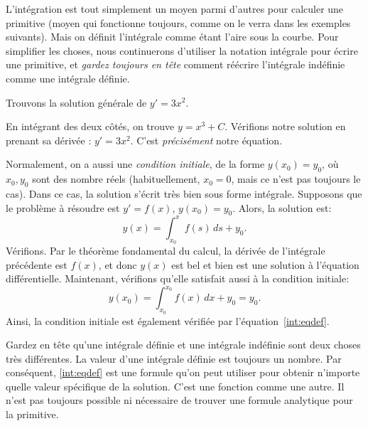 L'intégration est tout simplement un moyen parmi d'autres pour calculer une primitive
(moyen qui fonctionne toujours, comme on le verra dans les exemples suivants).
Mais on définit l'intégrale comme étant l'aire sous la courbe.
Pour simplifier les choses, nous continuerons d'utiliser la notation intégrale pour écrire une primitive,
et \emph{gardez toujours en tête} comment réécrire l'intégrale indéfinie comme une intégrale définie.

\begin{example}
	Trouvons la solution générale de $y' = 3 x^2$.

	En intégrant des deux côtés, on trouve $y = x^3 + C$.  Vérifions notre solution en prenant sa dérivée :
	$y' = 3x^2$.  C'est \emph{précisément} notre équation.
\end{example}

Normalement, on a aussi une {\em condition initiale}, de la forme $y(x_0) = y_0$, où $x_0,y_0$ sont des nombre réels (habituellement, $x_0=0$, mais ce n'est pas toujours le cas).
Dans ce cas, la solution s'écrit très bien sous forme intégrale.
Supposons que le problème à résoudre est $y' = f(x)$, $y(x_0) = y_0$. Alors, la solution est:
%
\begin{equation} \label{int:eqdef}
	y(x) = \int_{x_0}^x f(s) \,ds + y_0 .
\end{equation}
Vérifions.  Par le théorème fondamental du calcul, la dérivée de l'intégrale précédente est $f(x)$,
et donc $y(x)$ est bel et bien est une solution à l'équation différentielle.
Maintenant, vérifions qu'elle satisfait aussi à la condition initiale:
\begin{equation*}
	y(x_0) = \int_{x_0}^{x_0} f(x)\,dx + y_0 = y_0.
\end{equation*}
Ainsi, la condition initiale est également vérifiée par l'équation~\eqref{int:eqdef}.

Gardez en tête qu'une intégrale définie et une intégrale indéfinie sont deux choses très différentes.
La valeur d'une intégrale définie est toujours un nombre.
Par conséquent, \eqref{int:eqdef} est une formule qu'on peut utiliser pour obtenir n'importe quelle valeur spécifique de la solution.
C'est une fonction comme une autre.  Il n'est pas toujours possible ni nécessaire de trouver une formule analytique pour la primitive.


